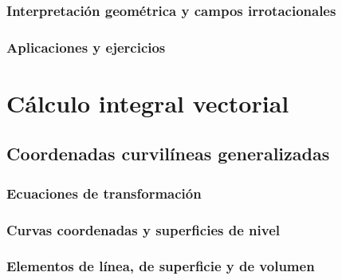 \documentclass[12pt,openany]{book}
\begin{document}
	   \subsection{Interpretaci\'on geom\'etrica y campos irrotacionales}

	   \subsection{Aplicaciones y ejercicios}

\chapter{C\'alculo integral vectorial}

	\section{Coordenadas curvil\'ineas generalizadas}

	   \subsection{Ecuaciones de transformaci\'on}

	   \subsection{Curvas coordenadas y superficies de nivel}

	   \subsection{Elementos de l\'inea, de superficie y de volumen}
\end{document}
